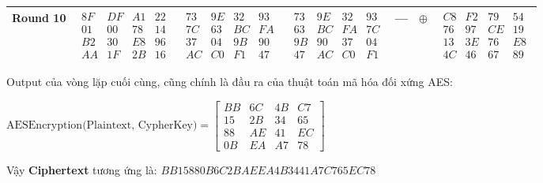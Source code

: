 \begin{enumerate}[label= \textbf{Bước \arabic*:}]
\begin{table}[h]
{\begin{tabular}{|c|c|c|c|c|c|c|}
				Round 10 & 
				$\begin{array}{cccc} 8F & DF & A1 & 22 \\ 01 & 00 & 78 & 14 \\ B2 & 30 & E8 & 96 \\ AA & 1F & 2B & 16 \end{array}$ & 
				$\begin{array}{cccc} 73 & 9E & 32 & 93 \\ 7C & 63 & BC & FA \\ 37 & 04 & 9B & 90 \\ AC & C0 & F1 & 47 \end{array}$ & 
				$\begin{array}{cccc} 73 & 9E & 32 & 93 \\ 63 & BC & FA & 7C \\ 9B & 90 & 37 & 04 \\ 47 & AC & C0 & F1 \end{array}$ & 
				--- & 
				$\oplus$ &
				$\begin{array}{cccc} C8 & F2 & 79 & 54 \\ 76 & 97 & CE & 19 \\ 13 & 3E & 76 & E8 \\ 4C & 46 & 67 & 89 \end{array}$ \\ \hline
			\end{tabular}
		}
	\end{table}
	
\end{enumerate}

Output của vòng lặp cuối cùng, cũng chính là đầu ra của thuật toán mã hóa đối xứng AES:

\begin{center}
	$
	\text{AESEncryption(Plaintext, CypherKey)}
	=
	\begin{bmatrix}
		BB & 6C & 4B & C7\\
		15 & 2B & 34 & 65\\
		88 & AE & 41 & EC\\
		0B & EA & A7 & 78
	\end{bmatrix}
	$
	
\end{center}

Vậy \textbf{Ciphertext} tương ứng là: $BB15880B6C2BAEEA4B3441A7C765EC78$

